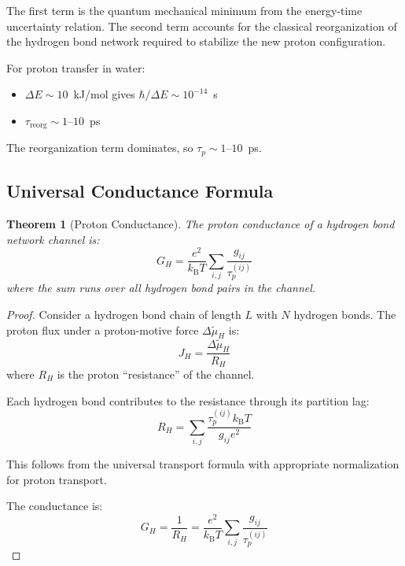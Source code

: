 \documentclass[twocolumn,showpacs,preprintnumbers,amsmath,amssymb,prd]{revtex4-2}
\newtheorem{theorem}{Theorem}[section]
\newcommand{\taup}{\tau_p}
\newcommand{\kB}{k_{\text{B}}}
\begin{document}
The first term is the quantum mechanical minimum from the energy-time uncertainty relation. The second term accounts for the classical reorganization of the hydrogen bond network required to stabilize the new proton configuration.

For proton transfer in water:
\begin{itemize}
\item $\Delta E \sim 10$~kJ/mol gives $\hbar/\Delta E \sim 10^{-14}$~s
\item $\tau_{\text{reorg}} \sim 1$--$10$~ps
\end{itemize}

The reorganization term dominates, so $\taup \sim 1$--$10$~ps.

\subsection{Universal Conductance Formula}

\begin{theorem}[Proton Conductance]
\label{thm:proton_conductance}
The proton conductance of a hydrogen bond network channel is:
\begin{equation}
G_H = \frac{e^2}{\kB T} \sum_{i,j} \frac{g_{ij}}{\taup^{(ij)}}
\label{eq:proton_conductance}
\end{equation}
where the sum runs over all hydrogen bond pairs in the channel.
\end{theorem}

\begin{proof}
Consider a hydrogen bond chain of length $L$ with $N$ hydrogen bonds. The proton flux under a proton-motive force $\Delta\tilde{\mu}_H$ is:
\begin{equation}
J_H = \frac{\Delta\tilde{\mu}_H}{R_H}
\label{eq:proton_flux}
\end{equation}
where $R_H$ is the proton ``resistance'' of the channel.

Each hydrogen bond contributes to the resistance through its partition lag:
\begin{equation}
R_H = \sum_{i,j} \frac{\taup^{(ij)} \kB T}{g_{ij} e^2}
\label{eq:proton_resistance}
\end{equation}

This follows from the universal transport formula with appropriate normalization for proton transport.

The conductance is:
\begin{equation}
G_H = \frac{1}{R_H} = \frac{e^2}{\kB T} \sum_{i,j} \frac{g_{ij}}{\taup^{(ij)}}
\end{equation}
\end{proof}
\end{document}
